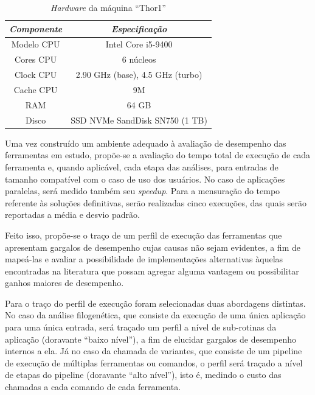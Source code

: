\documentclass[cic,tc]{iiufrgs}
\begin{document}
\begin{table}[h]
    \caption{\textit{Hardware} da máquina ``Thor1''}
    \centering
        \begin{tabular}{c|c}
          \hline
          \textit{Componente}  &   \textit{Especificação} \\
          \hline
          \hline
          Modelo CPU & Intel Core i5-9400 \\
          Cores CPU & 6 núcleos\\
          Clock CPU & 2.90 GHz (base), 4.5 GHz (turbo) \\
          Cache CPU & 9M \\
          RAM & 64 GB \\
          Disco & SSD NVMe SandDisk SN750 (1 TB) \\
          \hline
        \end{tabular}
    \label{tbl:thor1}
\end{table}

Uma vez construído um ambiente adequado à avaliação de desempenho das
ferramentas em estudo, propõe-se a avaliação do tempo total de execução de cada
ferramenta e, quando aplicável, cada etapa das análises, para entradas de
tamanho compatível com o caso de uso dos usuários. No caso de aplicações
paralelas, será medido também seu \textit{speedup}. Para a mensuração do tempo
referente às soluções definitivas, serão realizadas cinco execuções, das quais
serão reportadas a média e desvio padrão.

Feito isso, propõe-se o traço de um perfil de execução das ferramentas que
apresentam gargalos de desempenho cujas causas não sejam evidentes, a fim de
mapeá-las e avaliar a possibilidade de implementações alternativas àquelas
encontradas na literatura que possam agregar alguma vantagem ou possibilitar
ganhos maiores de desempenho.

Para o traço do perfil de execução foram selecionadas duas abordagens
distintas. No caso da análise filogenética, que consiste da execução de uma
única aplicação para uma única entrada, será traçado um perfil a nível de
sub-rotinas da aplicação (doravante ``baixo nível''), a fim de elucidar gargalos
de desempenho internos a ela. Já no caso da chamada de variantes, que consiste
de um pipeline de execução de múltiplas ferramentas ou comandos, o perfil será
traçado a nível de etapas do pipeline (doravante ``alto nível''), isto é,
medindo o custo das chamadas a cada comando de cada ferramenta.
\end{document}
